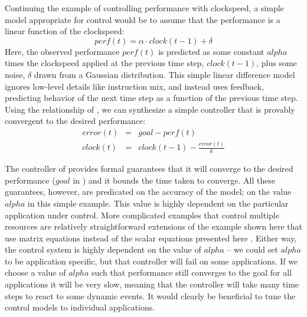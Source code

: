 Continuing the example of controlling performance with clockspeed, a
simple model appropriate for control would be to assume that the
performance is a linear function of the clockspeed:
\begin{equation}
  perf(t) = \alpha \cdot clock(t-1) + \delta \label{eqn:clock}
\end{equation}
Here, the observed performance $perf(t)$ is predicted as some constant
$alpha$ times the clockspeed applied at the previous time step,
$clock(t-1)$, plus some noise, $\delta$ drawn from a Gaussian
distribution.  This simple linear difference model ignores low-level
details like instruction mix, and instead uses feedback, predicting
behavior of the next time step as a function of the previous time
step.  Using the relationship of , we can synthesize a
simple controller that is provably convergent to the desired
performance:
\begin{eqnarray}
  error(t) &=& goal - perf(t) \label{eqn:clock-error} \\
  clock(t) &=& clock(t-1) - \frac{error(t)}{k}
  \label{eqn:clock-control}
\end{eqnarray}


The controller of  provides formal guarantees
that it will converge to the desired performance ($goal$ in
) and it bounds the time taken to converge.  All
these guarantees, however, are predicated on the accuracy of the
model; \ie on the value $alpha$ in this simple example.  This value is
highly dependent on the particular application under control.  More
complicated examples that control multiple resources are relatively
straightforward extensions of the example shown here that use matrix
equations instead of the scalar equations presented here
\cite{METE,others}.  Either way, the control system is highly
dependent on the value of $alpha$ -- we could set $alpha$ to be
application specific, but that controller will fail on some
applications.  If we choose a value of $alpha$ such that performance still
converges to the goal for all applications it will be very slow,
meaning that the controller will take many time steps to react to some
dynamic events.  It would clearly be beneficial to tune the control
models to individual applications.

